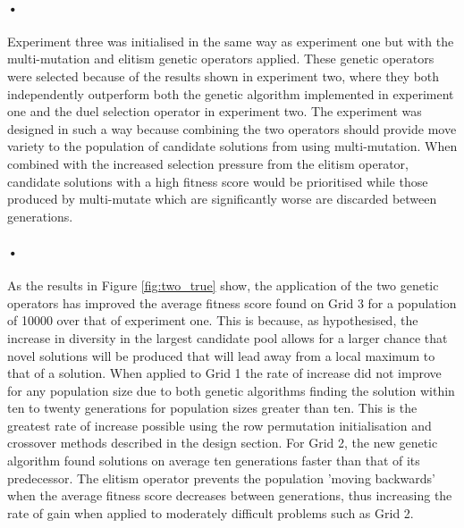 \documentclass[10pt]{article}
\begin{document}
\paragraph{•}
Experiment three was initialised in the same way as experiment one but with the multi-mutation and elitism genetic operators applied. These genetic operators were selected because of the results shown in experiment two, where they both independently outperform both the genetic algorithm implemented in experiment one and the duel selection operator in experiment two. The experiment was designed in such a way because combining the two operators should provide move variety to the population of candidate solutions from using multi-mutation. When combined with the increased selection pressure from the elitism operator, candidate solutions with a high fitness score would be prioritised while those produced by multi-mutate which are significantly worse are discarded between generations. 
\paragraph{•}
As the results in Figure \ref{fig:two_true} show, the application of the two genetic operators has improved the average fitness score found on Grid 3 for a population of 10000 over that of experiment one. This is because, as hypothesised, the increase in diversity in the largest candidate pool allows for a larger chance that novel solutions will be produced that will lead away from a local maximum to that of a solution. When applied to Grid 1 the rate of increase did not improve for any population size due to both genetic algorithms finding the solution within ten to twenty generations for population sizes greater than ten. This is the greatest rate of increase possible using the row permutation initialisation and crossover methods described in the design section. For Grid 2, the new genetic algorithm found solutions on average ten generations faster than that of its predecessor. The elitism operator prevents the population 'moving backwards' when the average fitness score decreases between generations, thus increasing the rate of gain when applied to moderately difficult problems such as Grid 2.
\end{document}
